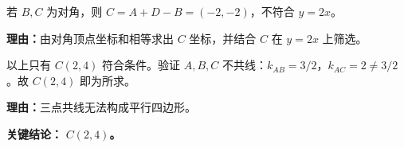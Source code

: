 \begin{examplebox}
\begin{description}[style=nextline, leftmargin=2.8em, labelsep=0.5em, itemsep=0.45em]
			若 $B,C$ 为对角，则 $C = A+D-B = (-2,-2)$，不符合 $y=2x$。
			\par\textbf{理由：}由对角顶点坐标和相等求出 $C$ 坐标，并结合 $C$ 在 $y=2x$ 上筛选。
		\item[\textbf{第三步（验证共线并确定答案）：}]以上只有 $C(2,4)$ 符合条件。验证 $A,B,C$ 不共线：$k_{AB}=3/2$，$k_{AC}=2\neq 3/2$。故 $C(2,4)$ 即为所求。
			\par\textbf{理由：}三点共线无法构成平行四边形。
	\end{description}
	\textbf{\textcolor{CExample}{关键结论：}}
	\textbf{$C(2,4)$。}
\end{examplebox}
